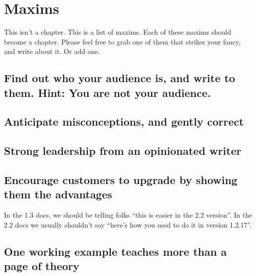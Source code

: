 \chapter{Maxims}

This isn't a chapter. This is a list of maxims. Each of these maxims
should become a chapter. Please feel free to grab one of them that
strikes your fancy, and write about it. Or add one.

\section{Find out who your audience is, and write to them. Hint: You are
not your audience.}

\section{Anticipate misconceptions, and gently correct}

\section{Strong leadership from an opinionated writer}

\section{Encourage customers to upgrade by showing them the advantages}

In the 1.3 docs, we should be telling folks ``this is easier in the 2.2
version''. In the 2.2 docs we usually shouldn't say ``here's how you
used to do it in version 1.2.17''.

\section{One working example teaches more than a page of theory}



